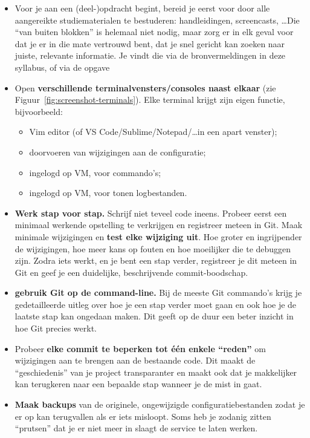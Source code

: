 \begin{itemize}
  \item Voor je aan een (deel-)opdracht begint, bereid je eerst voor door alle aangereikte studiematerialen te bestuderen: handleidingen, screencasts, \ldots Die ``van buiten blokken'' is helemaal niet nodig, maar zorg er in elk geval voor dat je er in die mate vertrouwd bent, dat je snel gericht kan zoeken naar juiste, relevante informatie. Je vindt die via de bronvermeldingen in deze syllabus, of via de opgave
  \item Open \textbf{verschillende terminalvensters/consoles naast elkaar} (zie Figuur~\ref{fig:screenshot-terminals}). Elke terminal krijgt zijn eigen functie, bijvoorbeeld:
    \begin{itemize}
      \item Vim editor (of VS Code/Sublime/Notepad/\ldots in een apart venster);
      \item doorvoeren van wijzigingen aan de configuratie;
      \item ingelogd op VM, voor commando's;
      \item ingelogd op VM, voor tonen logbestanden.
    \end{itemize}
  \item \textbf{Werk stap voor stap.} Schrijf niet teveel code ineens. Probeer eerst een minimaal werkende opstelling te verkrijgen en registreer meteen in Git. Maak minimale wijzigingen en \textbf{test elke wijziging uit}. Hoe groter en ingrijpender de wijzigingen, hoe meer kans op fouten en hoe moeilijker die te debuggen zijn. Zodra iets werkt, en je bent een stap verder, registreer je dit meteen in Git en geef je een duidelijke, beschrijvende commit-boodschap.
  \item \textbf{gebruik Git op de command-line.} Bij de meeste Git commando's krijg je gedetailleerde uitleg over hoe je een stap verder moet gaan en ook hoe je de laatste stap kan ongedaan maken. Dit geeft op de duur een beter inzicht in hoe Git precies werkt.
  \item Probeer \textbf{elke commit te beperken tot één enkele ``reden''} om wijzigingen aan te brengen aan de bestaande code. Dit maakt de ``geschiedenis'' van je project transparanter en maakt ook dat je makkelijker kan terugkeren naar een bepaalde stap wanneer je de mist in gaat.
  \item \textbf{Maak backups} van de originele, ongewijzigde configuratiebestanden zodat je er op kan terugvallen als er iets misloopt. Soms heb je zodanig zitten ``prutsen'' dat je er niet meer in slaagt de service te laten werken.

\end{itemize}
